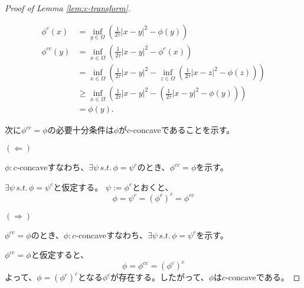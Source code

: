 \documentclass{jsarticle}
\theoremstyle{definition}
\begin{document}
\begin{proof}[Proof of Lemma \ref{lem:c-transform}]
    \hypertarget{proof:lem:c-transform}{}
    \begin{align*}
        \phi^c(x)    &= \inf_{y\in\Omega} \left(\frac{1}{2 \tau}|x - y|^2 - \phi(y)\right)\\
        \phi^{cc}(y) &= \inf_{x\in\Omega} \left(\frac{1}{2 \tau}|x - y|^2 - \phi^c(x)\right)\\
                  &= \inf_{x\in\Omega} \left(\frac{1}{2 \tau}|x - y|^2 - \inf_{z\in\Omega} \left(\frac{1}{2 \tau}|x - z|^2 - \phi(z)\right)\right)\\
                  &\ge  \inf_{x\in\Omega} \left(\frac{1}{2 \tau}|x - y|^2 - \left(\frac{1}{2 \tau}|x - y|^2 - \phi(y)\right)\right)\\
                  &= \phi(y).
    \end{align*}

    次に$\phi^{cc} = \phi$の必要十分条件は$\phi$が$c$-concaveであることを示す。

    $(\Leftarrow)$

    $\phi: c$-concaveすなわち、$\exists \psi \, s.t. \, \phi = \psi^c$のとき、$\phi^{cc} = \phi$を示す。

    $\exists \psi \, s.t. \, \phi = \psi^c$と仮定する。
    $\psi := \phi^c$とおくと、
    $$
    \phi = \psi^c = (\phi^c)^c= \phi^{cc}
    $$

    $(\Rightarrow)$

    $\phi^{cc} = \phi$のとき、$\phi: c$-concaveすなわち、$\exists \psi \, s.t. \, \phi = \psi^c$を示す。

    $\phi^{cc} = \phi$と仮定すると、
    $$
    \phi = \phi^{cc} = (\phi^c)^c
    $$
    よって、$\phi = (\phi^c)^c$となる$\phi^c$が存在する。したがって、$\phi$は$c$-concaveである。



\end{proof}
\end{document}
